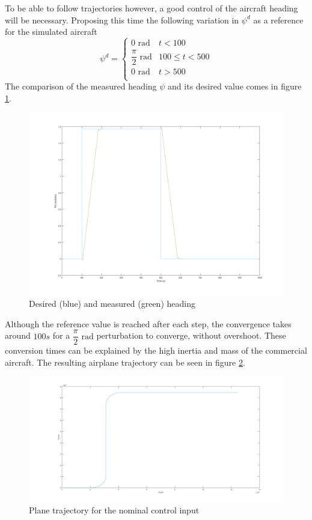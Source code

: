 To be able to follow trajectories however, a good control of the aircraft heading will be necessary. Proposing this time the following variation in $\psi^d$ as a reference for the simulated aircraft
\begin{equation}
\psi^d = \begin{cases}
0\text{ rad} & t < 100\\
\dfrac{\pi}{2}\text{ rad} & 100 \leq t < 500\\
0\text{ rad} & t > 500 \\
\end{cases}
\label{eq:test_traj}
\end{equation}
The comparison of the measured heading $\psi$ and its desired value comes in figure \ref{fig:heading_test}.
\begin{figure}[H]
\centering
\includegraphics[width=\textwidth]{Figures/Results/heading_test.png}
\caption[Desired and measured heading]{Desired (blue) and measured (green) heading}
\label{fig:heading_test}
\end{figure}

Although the reference value is reached after each step, the convergence takes around $100s$ for a $\dfrac{\pi}{2}\text{ rad}$ perturbation to converge, without overshoot. These conversion times can be explained by the high inertia and mass of the commercial aircraft. The resulting airplane trajectory can be seen in figure \ref{fig:trajectory}.

\begin{figure}[H]
\centering
\includegraphics[width=\textwidth]{Figures/Results/trajectory.png}
\caption[Plane trajectory]{Plane trajectory for the nominal control input}
\label{fig:trajectory}
\end{figure}

